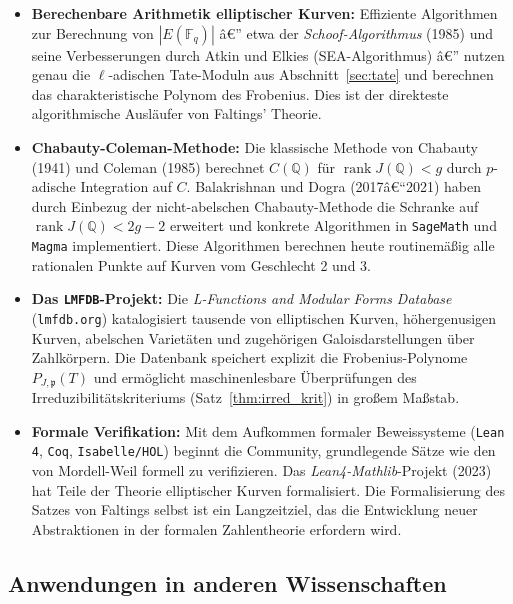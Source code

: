 ﻿\documentclass[12pt,a4paper]{article}
\theoremstyle{plain}
\theoremstyle{definition}
\theoremstyle{remark}
\newcommand{\Q}{\mathbb{Q}}
\newcommand{\F}{\mathbb{F}}
\DeclareMathOperator{\rank}{rank}
\begin{document}
\begin{itemize}[leftmargin=2em,itemsep=4pt]
  \item \textbf{Berechenbare Arithmetik elliptischer Kurven:}
    Effiziente Algorithmen zur Berechnung von $|E(\F_q)|$ â€” etwa der
    \emph{Schoof-Algorithmus} (1985) und seine Verbesserungen durch
    Atkin und Elkies (SEA-Algorithmus) â€” nutzen genau die $\ell$-adischen
    Tate-Moduln aus Abschnitt~\ref{sec:tate} und berechnen das charakteristische
    Polynom des Frobenius. Dies ist der direkteste algorithmische Ausläufer
    von Faltings' Theorie.

  \item \textbf{Chabauty-Coleman-Methode:}
    Die klassische Methode von Chabauty (1941) und Coleman (1985) berechnet
    $C(\Q)$ für $\rank J(\Q) < g$ durch $p$-adische Integration auf $C$.
    Balakrishnan und Dogra (2017â€“2021) haben durch Einbezug der
    nicht-abelschen Chabauty-Methode die Schranke auf $\rank J(\Q) < 2g-2$
    erweitert und konkrete Algorithmen in \texttt{SageMath} und \texttt{Magma}
    implementiert. Diese Algorithmen berechnen heute routinemäßig alle rationalen
    Punkte auf Kurven vom Geschlecht 2 und 3.

  \item \textbf{Das \texttt{LMFDB}-Projekt:}
    Die \emph{L-Functions and Modular Forms Database} (\texttt{lmfdb.org}) katalogisiert
    tausende von elliptischen Kurven, höhergenusigen Kurven, abelschen Varietäten
    und zugehörigen Galoisdarstellungen über Zahlkörpern. Die Datenbank speichert
    explizit die Frobenius-Polynome $P_{J,\mathfrak p}(T)$ und ermöglicht
    maschinenlesbare Überprüfungen des Irreduzibilitätskriteriums
    (Satz~\ref{thm:irred_krit}) in großem Maßstab.

  \item \textbf{Formale Verifikation:}
    Mit dem Aufkommen formaler Beweissysteme (\texttt{Lean 4}, \texttt{Coq},
    \texttt{Isabelle/HOL}) beginnt die Community, grundlegende Sätze wie den
    von Mordell-Weil formell zu verifizieren. Das \emph{Lean4-Mathlib}-Projekt
    (2023) hat Teile der Theorie elliptischer Kurven formalisiert.
    Die Formalisierung des Satzes von Faltings selbst ist ein Langzeitziel,
    das die Entwicklung neuer Abstraktionen in der formalen Zahlentheorie
    erfordern wird.
\end{itemize}

\subsection{Anwendungen in anderen Wissenschaften}
\end{document}
